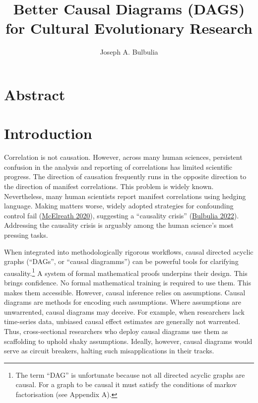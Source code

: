 \documentclass[
  singlecolumn]{report}
\title{Better Causal Diagrams (DAGS) for Cultural Evolutionary Research}
\author{Joseph A. Bulbulia}
\date{}
\begin{document}
\maketitle
\ifdefined\Shaded\renewenvironment{Shaded}{\begin{tcolorbox}[sharp corners, borderline west={3pt}{0pt}{shadecolor}, interior hidden, enhanced, frame hidden, boxrule=0pt, breakable]}{\end{tcolorbox}}\fi

\listoffigures
\listoftables
\hypertarget{abstract}{%
\section{Abstract}\label{abstract}}

\hypertarget{introduction}{%
\section{Introduction}\label{introduction}}

Correlation is not causation. However, across many human sciences,
persistent confusion in the analysis and reporting of correlations has
limited scientific progress. The direction of causation frequently runs
in the opposite direction to the direction of manifest correlations.
This problem is widely known. Nevertheless, many human scientists report
manifest correlations using hedging language. Making matters worse,
widely adopted strategies for confounding control fail
(\protect\hyperlink{ref-mcelreath2020}{McElreath 2020}), suggesting a
``causality crisis'' (\protect\hyperlink{ref-bulbulia2022}{Bulbulia
2022}). Addressing the causality crisis is arguably among the human
science's most pressing tasks.

When integrated into methodologically rigorous workflows, causal
directed acyclic graphs (``DAGs'', or ``causal diagramms'') can be
powerful tools for clarifying causality.\footnote{The term ``DAG'' is
  unfortunate because not all directed acyclic graphs are causal. For a
  graph to be causal it must satisfy the conditions of markov
  factorisation (see Appendix A).} A system of formal mathematical
proofs underpins their design. This brings confidence. No formal
mathematical training is required to use them. This makes them
accessible. However, causal inference relies on assumptions. Causal
diagrams are methods for encoding such assumptions. Where assumptions
are unwarrented, causal diagrams may deceive. For example, when
researchers lack time-series data, unbiased causal effect estimates are
generally not warrented. Thus, cross-sectional researchers who deploy
causal diagrams use them as scaffolding to uphold shaky assumptions.
Ideally, however, causal diagrams would serve as circuit breakers,
halting such misapplications in their tracks.
\end{document}

